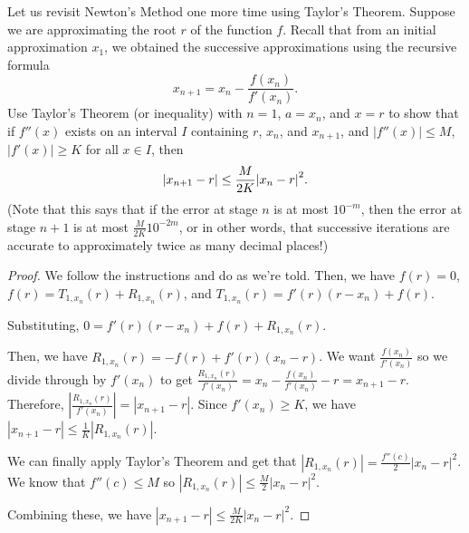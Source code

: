 \documentclass{agony}
\begin{document}
\question Let us revisit Newton's Method one more time using Taylor's Theorem.
Suppose we are approximating the root $r$ of the function $f$.
Recall that from an initial approximation $x_1$,
we obtained the successive approximations using the recursive formula
\[ x_{n+1} = x_n - \frac{f(x_n)}{f'(x_n)}. \]
Use Taylor's Theorem (or inequality) with $n=1$, $a=x_n$, and $x=r$
to show that if $f''(x)$ exists on an interval $I$ containing $r$, $x_n$, and $x_{n+1}$,
and $|f''(x)| \leq M$, $|f'(x)| \geq K$ for all $x \in I$, then
\[ \abs{x_{n+1}-r} \leq \frac{M}{2K}\abs{x_n-r}^2. \]
(Note that this says that if the error at stage $n$ is at most $10^{-m}$,
then the error at stage $n+1$ is at most $\frac{M}{2K}10^{-2m}$, or in other words,
that successive iterations are accurate to approximately twice as many decimal places!)
\begin{proof}
  We follow the instructions and do as we're told.
  Then, we have $f(r) = 0$, $f(r) = T_{1,x_n}(r) + R_{1,x_n}(r)$, and $T_{1,x_n}(r) = f'(r)(r-x_n) + f(r)$.

  Substituting, $0 = f'(r)(r-x_n) + f(r) + R_{1,x_n}(r)$.

  Then, we have $R_{1,x_n}(r) = -f(r) + f'(r)(x_n-r)$.
  We want $\frac{f(x_n)}{f'(x_n)}$ so we divide through by $f'(x_n)$
  to get $\frac{R_{1,x_n}(r)}{f'(x_n)} = x_n - \frac{f(x_n)}{f'(x_n)} - r = x_{n+1} - r$.
  Therefore, $|\frac{R_{1,x_n}(r)}{f'(x_n)}| = |x_{n+1} - r|$.
  Since $f'(x_n) \geq K$, we have $|x_{n+1} - r| \leq \frac{1}{K}|R_{1,x_n}(r)|$.

  We can finally apply Taylor's Theorem and get that $|R_{1,x_n}(r)| = \frac{f''(c)}{2}|x_n-r|^2$.
  We know that $f''(c) \leq M$ so $|R_{1,x_n}(r)| \leq \frac{M}{2}|x_n-r|^2$.

  Combining these, we have $|x_{n+1} - r| \leq \frac{M}{2K}|x_n-r|^2$.
\end{proof}
\end{document}
